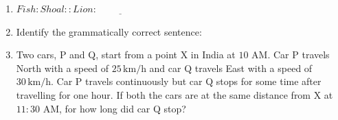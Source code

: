 \documentclass[journal]{IEEEtran}
\begin{document}
\begin{enumerate}[leftmargin=0pt]

\item
$Fish\colon Shoal\colon\colon Lion\colon\underline{\hspace{2cm}}$
\vspace{0.2cm}
\begin{enumerate}
\end{enumerate}
\hfill{}

\item
Identify the grammatically correct sentence$\colon$
\vspace{0.2cm}
\begin{enumerate}
\end{enumerate}
\hfill{}

\item
Two cars, P and Q, start from a point X in India at $10$ AM. Car P travels North with a speed of $25\,\text{km/h}$ and car Q travels East with a speed of $30\,\text{km/h}$. Car P travels continuously but car Q stops for some time after travelling for one hour. If both the cars are at the same distance from X at $11\colon30$ AM, for how long  did car Q stop?

\vspace{0.2cm}
\begin{enumerate}
\end{enumerate}
\hfill{}


\end{enumerate}
\end{document}
